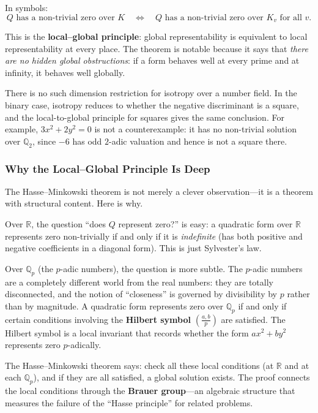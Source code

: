 In symbols:
\[
    Q \text{ has a non-trivial zero over } K
    \quad\Longleftrightarrow\quad
    Q \text{ has a non-trivial zero over } K_v \text{ for all } v.
\]

This is the \textbf{local--global principle}: global representability is equivalent to local representability at every place. The theorem is notable because it says that \emph{there are no hidden global obstructions}: if a form behaves well at every prime and at infinity, it behaves well globally.

\begin{remark}
There is no such dimension restriction for isotropy over a number field. In the binary case, isotropy reduces to whether the negative discriminant is a square, and the local-to-global principle for squares gives the same conclusion. For example, $3x^2+2y^2=0$ is not a counterexample: it has no non-trivial solution over $\mathbb{Q}_2$, since $-6$ has odd $2$-adic valuation and hence is not a square there.
\end{remark}

\subsubsection{Why the Local--Global Principle Is Deep}

The Hasse--Minkowski theorem is not merely a clever observation---it is a theorem with structural content. Here is why.

Over $\mathbb{R}$, the question ``does $Q$ represent zero?'' is easy: a quadratic form over $\mathbb{R}$ represents zero non-trivially if and only if it is \emph{indefinite} (has both positive and negative coefficients in a diagonal form). This is just Sylvester's law.

Over $\mathbb{Q}_p$ (the $p$-adic numbers), the question is more subtle. The $p$-adic numbers are a completely different world from the real numbers: they are totally disconnected, and the notion of ``closeness'' is governed by divisibility by $p$ rather than by magnitude. A quadratic form represents zero over $\mathbb{Q}_p$ if and only if certain conditions involving the \textbf{Hilbert symbol} $\left(\frac{a, b}{p}\right)$ are satisfied. The Hilbert symbol is a local invariant that records whether the form $ax^2 + by^2$ represents zero $p$-adically.

The Hasse--Minkowski theorem says: check all these local conditions (at $\mathbb{R}$ and at each $\mathbb{Q}_p$), and if they are all satisfied, a global solution exists. The proof connects the local conditions through the \textbf{Brauer group}---an algebraic structure that measures the failure of the ``Hasse principle'' for related problems.

